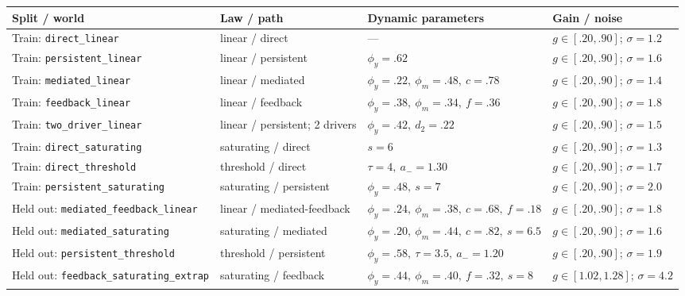 \begin{center}
\begin{minipage}{\linewidth}
\centering
{}
\label{tab:exp3-expanded-worlds}
\scriptsize
\setlength{\tabcolsep}{3pt}
\begin{tabular}{p{.29\linewidth}p{.19\linewidth}p{.29\linewidth}p{.15\linewidth}}
\toprule
\textbf{Split / world} & \textbf{Law / path} & \textbf{Dynamic parameters} &
\textbf{Gain / noise} \\
\midrule
Train: \texttt{direct\_linear} & linear / direct & --- &
$g\in[.20,.90]$; $\sigma=1.2$ \\
Train: \texttt{persistent\_linear} & linear / persistent & $\phi_y=.62$ &
$g\in[.20,.90]$; $\sigma=1.6$ \\
Train: \texttt{mediated\_linear} & linear / mediated &
$\phi_y=.22,\ \phi_m=.48,\ c=.78$ &
$g\in[.20,.90]$; $\sigma=1.4$ \\
Train: \texttt{feedback\_linear} & linear / feedback &
$\phi_y=.38,\ \phi_m=.34,\ f=.36$ &
$g\in[.20,.90]$; $\sigma=1.8$ \\
Train: \texttt{two\_driver\_linear} & linear / persistent; 2 drivers &
$\phi_y=.42,\ d_2=.22$ &
$g\in[.20,.90]$; $\sigma=1.5$ \\
Train: \texttt{direct\_saturating} & saturating / direct & $s=6$ &
$g\in[.20,.90]$; $\sigma=1.3$ \\
Train: \texttt{direct\_threshold} & threshold / direct &
$\tau=4,\ a_-=1.30$ &
$g\in[.20,.90]$; $\sigma=1.7$ \\
Train: \texttt{persistent\_saturating} & saturating / persistent &
$\phi_y=.48,\ s=7$ &
$g\in[.20,.90]$; $\sigma=2.0$ \\
Held out: \texttt{mediated\_feedback\_linear} & linear / mediated-feedback &
$\phi_y=.24,\ \phi_m=.38,\ c=.68,\ f=.18$ &
$g\in[.20,.90]$; $\sigma=1.8$ \\
Held out: \texttt{mediated\_saturating} & saturating / mediated &
$\phi_y=.20,\ \phi_m=.44,\ c=.82,\ s=6.5$ &
$g\in[.20,.90]$; $\sigma=1.6$ \\
Held out: \texttt{persistent\_threshold} & threshold / persistent &
$\phi_y=.58,\ \tau=3.5,\ a_-=1.20$ &
$g\in[.20,.90]$; $\sigma=1.9$ \\
Held out: \texttt{feedback\_saturating\_extrap} & saturating / feedback &
$\phi_y=.44,\ \phi_m=.40,\ f=.32,\ s=8$ &
$g\in[1.02,1.28]$; $\sigma=4.2$ \\
\bottomrule
\end{tabular}
\end{minipage}
\end{center}

